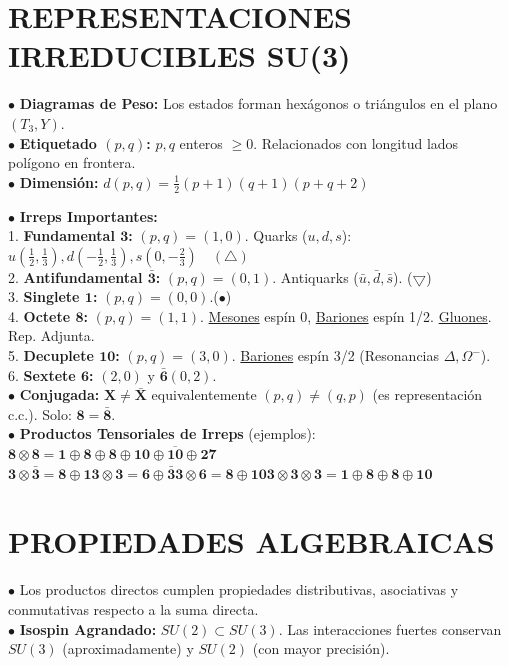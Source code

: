 \section{REPRESENTACIONES IRREDUCIBLES SU(3)}
$\bullet$ \textbf{Diagramas de Peso:} Los estados forman hexágonos o triángulos en el plano $(T_3, Y)$.
\\$\bullet$ \textbf{Etiquetado $(p,q)$:} $p, q$ enteros $\geq 0$. Relacionados con longitud lados polígono en frontera.\\
$\bullet$ \textbf{Dimensión:} $ d(p,q) = \frac{1}{2}(p+1)(q+1)(p+q+2)$

$\bullet$ \textbf{Irreps Importantes:}\\
1. \textbf{Fundamental $\mathbf{3}$:} $(p,q)=(1,0)$.
   Quarks ($u, d, s$):  $u(\frac{1}{2}, \frac{1}{3}), d(-\frac{1}{2}, \frac{1}{3}), s(0, -\frac{2}{3})\quad (\triangle)$\\
2. \textbf{Antifundamental $\bar{\mathbf{3}}$:} $(p,q)=(0,1)$.
   Antiquarks ($\bar{u}, \bar{d}, \bar{s}$). \quad($\bigtriangledown$)\\
3. \textbf{Singlete $\mathbf{1}$:} $(p,q)=(0,0)$.\quad ($\bullet$)\\
4. \textbf{Octete $\mathbf{8}$:} $(p,q)=(1,1)$.
   \hyperlink{Mesones}{Mesones} espín 0, \hyperlink{Bariones}{Bariones} espín 1/2. \hyperlink{Gluones}{Gluones}. Rep. Adjunta.\\
5. \textbf{Decuplete $\mathbf{10}$:} $(p,q)=(3,0)$.
   \hyperlink{Bariones_big}{Bariones} espín 3/2 (Resonancias $\Delta, \Omega^-$).\\
6. \textbf{Sextete $\mathbf{6}$:} $(2,0)$ y $\bar{\mathbf{6}} (0,2)$.\\
$\bullet$ \textbf{Conjugada:} $\textbf{X}\neq\bar{\textbf{X}}$ equivalentemente $(p,q)\neq(q,p)$ (es representación c.c.). Solo: $\textbf{8}=\bar{\textbf{8}}$.\\
$\bullet$ \textbf{Productos Tensoriales de Irreps} (ejemplos): $\textbf{8} \otimes {\textbf{8}} = \textbf{1} \oplus {\textbf{8}} \oplus \textbf{8} \oplus \textbf{10}\oplus \overline{\textbf{10}} \oplus {\textbf{27}}$\\
$\textbf{3} \otimes \bar{\textbf{3}} =\textbf{8}\oplus \textbf{1}$\quad$\textbf{3} \otimes {\textbf{3}} = \textbf{6} \oplus \bar{\textbf{3}}$\quad$\textbf{3} \otimes {\textbf{6}} = \textbf{8} \oplus {\textbf{10}}$\quad$\textbf{3} \otimes {\textbf{3}} \otimes \textbf{3} = \textbf{1} \oplus {\textbf{8}} \oplus \textbf{8} \oplus \textbf{10}$


\section{PROPIEDADES ALGEBRAICAS}
$\bullet$ Los productos directos cumplen propiedades distributivas, asociativas y conmutativas respecto a la suma directa.\\
$\bullet$ \textbf{Isospin Agrandado:} $SU(2) \subset SU(3)$. Las interacciones fuertes conservan $SU(3)$ (aproximadamente) y $SU(2)$ (con mayor precisión).


